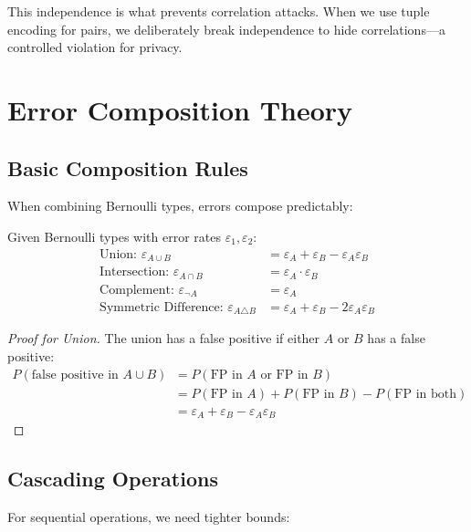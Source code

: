 This independence is what prevents correlation attacks. When we use tuple encoding for pairs, we deliberately break independence to hide correlations—a controlled violation for privacy.

\section{Error Composition Theory}

\subsection{Basic Composition Rules}

When combining Bernoulli types, errors compose predictably:

\begin{theorem}
Given Bernoulli types with error rates $\varepsilon_1, \varepsilon_2$:
\begin{align}
\text{Union: } \varepsilon_{A \cup B} &= \varepsilon_A + \varepsilon_B - \varepsilon_A \varepsilon_B \\
\text{Intersection: } \varepsilon_{A \cap B} &= \varepsilon_A \cdot \varepsilon_B \\
\text{Complement: } \varepsilon_{\neg A} &= \varepsilon_A \\
\text{Symmetric Difference: } \varepsilon_{A \triangle B} &= \varepsilon_A + \varepsilon_B - 2\varepsilon_A\varepsilon_B
\end{align}
\end{theorem}

\begin{proof}[Proof for Union]
The union has a false positive if either $A$ or $B$ has a false positive:
\begin{align}
P(\text{false positive in } A \cup B) &= P(\text{FP in } A \text{ or FP in } B) \\
&= P(\text{FP in } A) + P(\text{FP in } B) - P(\text{FP in both}) \\
&= \varepsilon_A + \varepsilon_B - \varepsilon_A \varepsilon_B
\end{align}
\end{proof}

\subsection{Cascading Operations}

For sequential operations, we need tighter bounds:

